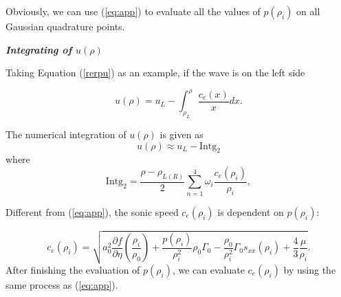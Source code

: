 \documentclass{article}
\numberwithin{equation}{section}
\numberwithin{table}{section}
\begin{document}
\begin{appendices}
Obviously, we can use (\ref{eq:app}) to evaluate all the values of $p(\rho_{i})$ on all Gaussian quadrature points.


\emph{\textbf{Integrating of $u(\rho)$}}

Taking Equation (\ref{rerpu}) as an example, if the wave is on the left side

$$u(\rho) = u_L - \int_{\rho_L}^{\rho} \frac{c_e(x)}{x} dx. $$

The numerical integration of $u(\rho)$ is given as
\begin{equation}
  u(\rho) \approx u_L - \text{Intg}_2
\end{equation}
where
$$\text{Intg}_2  =  \frac{\rho - \rho_{L(R)}}{2} \sum_{n=1}^4 \omega_i \frac{c_e(\rho_i)}{\rho_i}, $$

Different from (\ref{eq:app}), the sonic speed $c_e(\rho_i)$ is dependent on $p(\rho_i)$:

\begin{equation}
  c_e(\rho_i) =
  \sqrt{a_0^2 \frac{\partial f}{\partial \eta}\left(\frac{\rho_i}{\rho_0}\right) + \frac{p(\rho_i)}{\rho_i^2}\rho_0\Gamma_0 -\frac{\rho_0}{\rho_i^2}\Gamma_0 s_{xx}(\rho_i) +\frac{4}{3}\frac{\mu}{\rho_i}}. %
\end{equation}
After finishing the evaluation of  $p(\rho_{i})$, we can evaluate $c_e(\rho_i)$ by using the same process as (\ref{eq:app}).


\end{appendices}
\end{document}
